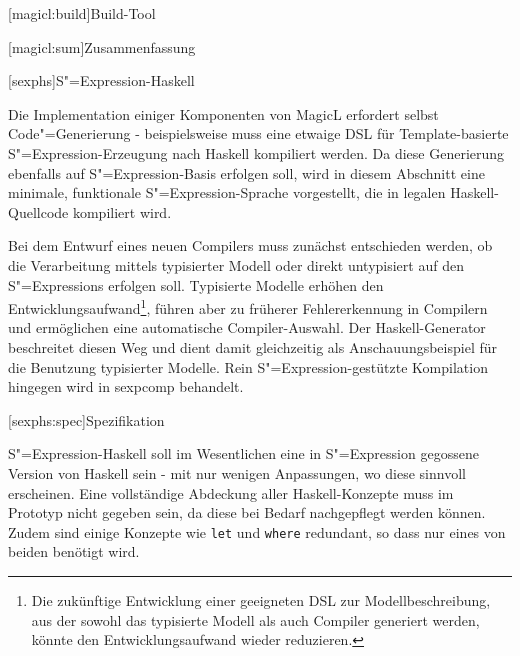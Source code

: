 \documentclass[11pt, a4paper, bibgerm]{scrbook}
\newcommand\icode[1]{\lstinline?#1?}
\newcommand\lchapter{}
\newcommand\lsection{}
\newcommand\cref{}
\newcommand{\sexp}{S"=Expression}
\newcommand{\sexps}{S"=Expressions}
\newcommand{\cgen}{Code"=Generierung}
\begin{document}
\lsection[magicl:build]{Build-Tool}



\lsection[magicl:sum]{Zusammenfassung}

\lchapter[sexphs]{\sexp{}-Haskell}

Die Implementation einiger Komponenten von MagicL erfordert selbst
\cgen{} - beispielsweise muss eine etwaige DSL für Template-basierte
\sexp{}-Erzeugung nach Haskell kompiliert werden. Da diese Generierung
ebenfalls auf \sexp{}-Basis erfolgen soll, wird in diesem Abschnitt
eine minimale, funktionale \sexp{}-Sprache vorgestellt, die in legalen
Haskell-Quellcode kompiliert wird.

Bei dem Entwurf eines neuen Compilers muss zunächst entschieden
werden, ob die Verarbeitung mittels typisierter Modell oder direkt
untypisiert auf den \sexps{} erfolgen soll. Typisierte Modelle erhöhen
den Entwicklungsaufwand\footnote{Die zukünftige Entwicklung einer
  geeigneten DSL zur Modellbeschreibung, aus der sowohl das typisierte
  Modell als auch Compiler generiert werden, könnte den
  Entwicklungsaufwand wieder reduzieren.}, führen aber zu früherer
Fehlererkennung in Compilern und ermöglichen eine automatische
Compiler-Auswahl. Der Haskell-Generator beschreitet diesen Weg und
dient damit gleichzeitig als Anschauungsbeispiel für die Benutzung
typisierter Modelle. Rein \sexp{}-gestützte Kompilation hingegen wird
in \cref{sexpcomp} behandelt.

\lsection[sexphs:spec]{Spezifikation}

\sexp{}-Haskell soll im Wesentlichen eine in \sexp{} gegossene Version
von Haskell sein - mit nur wenigen Anpassungen, wo diese sinnvoll
erscheinen. Eine vollständige Abdeckung aller Haskell-Konzepte muss im
Prototyp nicht gegeben sein, da diese bei Bedarf nachgepflegt werden
können. Zudem sind einige Konzepte wie \icode{let} und \icode{where}
redundant, so dass nur eines von beiden benötigt wird. 
\end{document}
